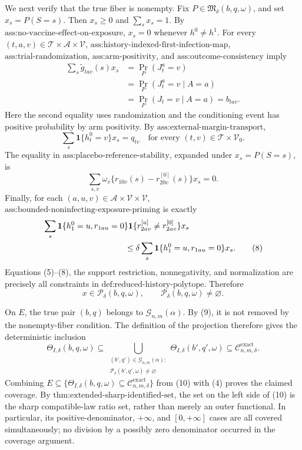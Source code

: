We next verify that the true fiber is nonempty. Fix \(P\in\mathfrak M_\delta(b,q,\omega)\), and set \(x_s=P(S=s)\). Then \(x_s\geq0\) and \(\sum_sx_s=1\). By \(\text{ass:no-vaccine-effect-on-exposure}\), \(x_s=0\) whenever \(h^0\neq h^1\). For every \((t,a,v)\in\mathcal T\times\mathcal A\times\mathcal V\), \(\text{ass:history-indexed-first-infection-map}\), \(\text{ass:trial-randomization}\), \(\text{ass:arm-positivity}\), and \(\text{ass:outcome-consistency}\) imply
\[
 \begin{aligned}
 \sum_s\widetilde g_{tav}(s)x_s
 &=\Pr_P(J_t^a=v)\\
 &=\Pr_P(J_t^a=v\mid A=a)\\
 &=\Pr_P(J_t=v\mid A=a)
 =b_{tav}. \tag{5}
 \end{aligned}
\]
Here the second equality uses randomization and the conditioning event has positive probability by arm positivity. By \(\text{ass:external-margin-transport}\),
\[
 \sum_s\mathbf 1\{h_t^0=v\}x_s=q_{tv}
 \quad\text{for every }(t,v)\in\mathcal T\times\mathcal V_0. \tag{6}
\]
The equality in \(\text{ass:placebo-reference-stability}\), expanded under \(x_s=P(S=s)\), is
\[
 \sum_{s,v}\omega_v\{r_{10v}(s)-r^{[0]}_{20v}(s)\}x_s=0. \tag{7}
\]
Finally, for each \((a,u,v)\in\mathcal A\times\mathcal V\times\mathcal V\), \(\text{ass:bounded-noninfecting-exposure-priming}\) is exactly
\[
 \begin{aligned}
 &\sum_s\mathbf 1\{h_1^0=u,r_{1au}=0\}
          \mathbf 1\{r^{[u]}_{2av}\neq r^{[0]}_{2av}\}x_s\\
 &\hspace{35mm}\leq
 \delta\sum_s\mathbf 1\{h_1^0=u,r_{1au}=0\}x_s. \tag{8}
 \end{aligned}
\]
Equations (5)--(8), the support restriction, nonnegativity, and normalization are precisely all constraints in \(\text{def:reduced-history-polytope}\). Therefore
\[
 x\in\mathcal P_\delta(b,q,\omega),
 \qquad
 \mathcal P_\delta(b,q,\omega)\neq\varnothing. \tag{9}
\]

On \(E\), the true pair \((b,q)\) belongs to \(\mathcal G_{n,m}(\alpha)\). By (9), it is not removed by the nonempty-fiber condition. The definition of the projection therefore gives the deterministic inclusion
\[
 \Theta_{I,\delta}(b,q,\omega)
 \subseteq
 \bigcup_{\substack{(b',q')\in\mathcal G_{n,m}(\alpha):\\
                     \mathcal P_\delta(b',q',\omega)\neq\varnothing}}
 \Theta_{I,\delta}(b',q',\omega)
 \subseteq\mathcal C_{n,m,\delta}^{\mathrm{exact}}. \tag{10}
\]
Combining \(E\subseteq\{\Theta_{I,\delta}(b,q,\omega)\subseteq\mathcal C_{n,m,\delta}^{\mathrm{exact}}\}\) from (10) with (4) proves the claimed coverage. By \(\text{thm:extended-sharp-identified-set}\), the set on the left side of (10) is the sharp compatible-law ratio set, rather than merely an outer functional. In particular, its positive-denominator, \(+\infty\), and \([0,+\infty]\) cases are all covered simultaneously; no division by a possibly zero denominator occurred in the coverage argument.

